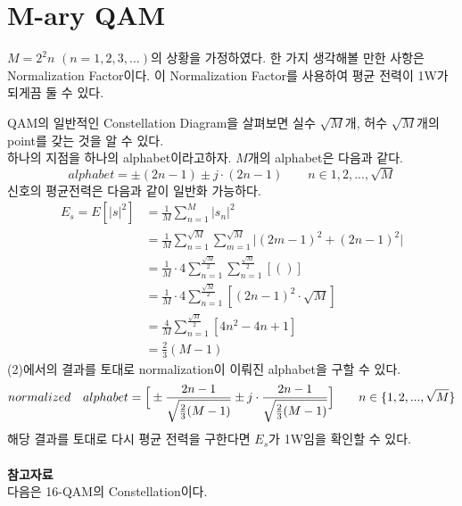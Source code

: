 \documentclass{article}
\newcommand{\bd}{\textbf} %
\providecommand{\abs}[1]{\lvert#1\rvert}
\begin{document}
\section{M-ary QAM}
$M=2^2n$ $(n=1,2,3,...)$의 상황을 가정하였다.
한 가지 생각해볼 만한 사항은 Normalization Factor이다. 이 Normalization Factor를 사용하여 평균 전력이 1W가 되게끔 둘 수 있다.

QAM의 일반적인 Constellation Diagram을 살펴보면 실수 $\sqrt{M}$개, 허수 $\sqrt{M}$개의 point를 갖는 것을 알 수 있다.\\
하나의 지점을 하나의 alphabet이라고하자. $M$개의 alphabet은 다음과 같다.
\begin{equation}
alphabet={\pm(2n-1)\pm j\cdot(2n-1)} \qquad n\in{1,2,...,\sqrt{M}}
\end{equation}
신호의 평균전력은 다음과 같이 일반화 가능하다.
\begin{equation}
\begin{split}
E_s=E[\abs{s}^2]&=\frac{1}{M}\sum_{n=1}^M \abs{s_n}^2\\
&=\frac{1}{M}\sum_{n=1}^{\sqrt{M}} \sum_{m=1}^{\sqrt{M}} \abs{(2m-1)^2+(2n-1)^2}\\
&=\frac{1}{M}\cdot4\sum_{n=1}^\frac{\sqrt{M}}{2}\sum_{n=1}^\frac{\sqrt{M}}{2}[()]\\
&=\frac{1}{M}\cdot4\sum_{n=1}^\frac{\sqrt{M}}{2}[(2n-1)^2\cdot\sqrt{M}]\\
&=\frac{4}{M}\sum_{n=1}^\frac{\sqrt{M}}{2}[4n^2-4n+1]\\
&=\frac{2}{3}(M-1)
\end{split}
\end{equation}
(2)에서의 결과를 토대로 normalization이 이뤄진 alphabet을 구할 수 있다.
\begin{equation}
normalized\quad alphabet=\Big{[}\pm\frac{2n-1}{\sqrt{\frac{2}{3}(M-1)}}\pm j\cdot\frac{2n-1}{\sqrt{\frac{2}{3}(M-1)}}\Big{]} \qquad n\in\{1,2,...,\sqrt{M}\}
\end{equation}
해당 결과를 토대로 다시 평균 전력을 구한다면 $E_s$가 1W임을 확인할 수 있다.\\
\\
\bd{참고자료}\\
다음은 16-QAM의 Constellation이다.\\
\end{document}
